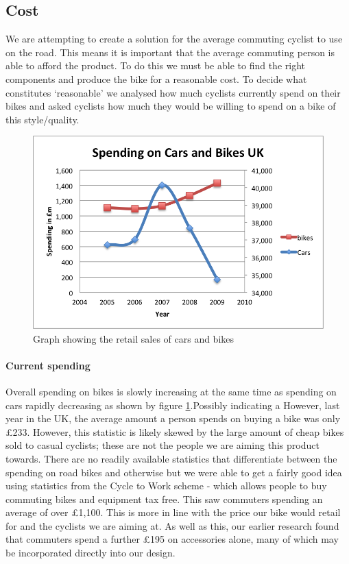 \documentclass[a4paper]{report}
\begin{document}
\subsection{Cost}
We are attempting to create a solution for the average commuting cyclist to use on the road. This means it is important that the average commuting person is able to afford the product. To do this we must be able to find the right components and produce the bike for a reasonable cost. To decide what constitutes `reasonable' we analysed how much cyclists currently spend on their bikes and asked cyclists how much they would be willing to spend on a bike of this style/quality.
\begin{figure}
\centering
\includegraphics[scale=0.9]{figures/cars-bikes-spending}
\caption{Graph showing the retail sales of cars and bikes \cite{uk-stats}}
\label{fig:cars_bikes_spending}
\end{figure}
\paragraph{Current spending}
Overall spending on bikes is slowly increasing at the same time as spending on cars rapidly decreasing as shown by figure \ref{fig:cars_bikes_spending}.Possibly indicating a   However, last year in the UK, the average amount a person spends on buying a bike was only £233. However, this statistic is likely skewed by the large amount of cheap bikes sold to casual cyclists; these are not the people we are aiming this product towards\cite{spending-more}. There are no readily available statistics that differentiate between the spending on road bikes and otherwise but we were able to get a fairly good idea using statistics from the Cycle to Work scheme - which allows people to buy commuting bikes and equipment tax free. This saw commuters spending an average of over £1,100\cite{spending-more}. This is more in line with the price our bike would retail for and the cyclists we are aiming at. As well as this, our earlier research found that commuters spend a further £195 on accessories alone, many of which may be incorporated directly into our design.
\end{document}
